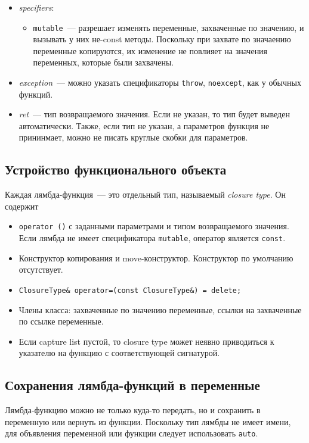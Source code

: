 \begin{itemize}
    \item \emph{specifiers}:
    \begin{itemize}
        \item \texttt{mutable}~--- разрешает изменять переменные, захваченные по значению, и вызывать у них
        не-const методы. Поскольку при захвате по значаению переменные копируются, их изменение не повлияет на значения
        переменных, которые были захвачены.
    \end{itemize}
    \item \emph{exception}~--- можно указать спецификаторы \texttt{throw}, \texttt{noexcept},
    как у обычных функций.
    \item \emph{ret}~--- тип возвращаемого значения. Если не указан, то тип будет выведен автоматически. Также, если тип
    не указан, а параметров функция не прининмает, можно не писать круглые скобки для параметров.
\end{itemize}

\subsection{Устройство функционального объекта}
Каждая лямбда-функция~--- это отдельный тип, называемый \emph{closure type}. Он содержит

\begin{itemize}
    \item \texttt{operator ()} с заданными параметрами и типом возвращаемого значения.
    Если лямбда не имеет спецификатора \texttt{mutable}, оператор является \texttt{const}.
    \item Конструктор копирования и move-конструктор. Конструктор по умолчанию отсутствует.
    \item \texttt{ClosureType& operator=(const ClosureType&) = delete;}
    \item Члены класса: захваченные по значению переменные, ссылки на захваченные по ссылке переменные.
    \item Если capture list пустой, то closure type может неявно приводиться к указателю на функцию с соответствующей сигнатурой.
\end{itemize}

\subsection{Сохранения лямбда-функций в переменные}

Лямбда-функцию можно не только куда-то передать, но и сохранить в переменную или вернуть из функции.
Поскольку тип лямбды не имеет имени, для объявления переменной или функции следует использовать \texttt{auto}.

